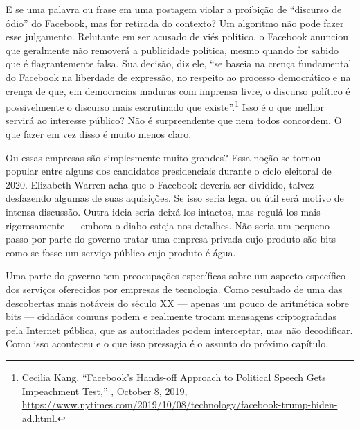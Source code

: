 E se uma palavra ou frase em uma postagem violar a proibição de ``discurso de ódio'' do Facebook,
mas for retirada do contexto? Um algoritmo não pode fazer esse julgamento. Relutante em ser acusado
de viés político, o Facebook anunciou que geralmente não removerá a publicidade política, mesmo
quando for sabido que é flagrantemente falsa. Sua decisão, diz ele, ``se baseia na crença fundamental
do Facebook na liberdade de expressão, no respeito ao processo democrático e na crença de que, em
democracias maduras com imprensa livre, o discurso político é possivelmente o discurso mais
escrutinado que existe''.\footnote{Cecilia Kang, ``Facebook’s Hands-off Approach to Political
Speech Gets Impeachment Test,'' , October 8, 2019,
\url{https://www.nytimes.com/2019/10/08/technology/facebook-trump-biden-ad.html}.} Isso é o que
melhor servirá ao interesse público? Não é surpreendente que nem todos concordem. O que fazer em
vez disso é muito menos claro.

Ou essas empresas são simplesmente muito grandes? Essa noção se tornou popular entre alguns dos
candidatos presidenciais durante o ciclo eleitoral de 2020. Elizabeth Warren acha que o Facebook
deveria ser dividido, talvez desfazendo algumas de suas aquisições. Se isso seria legal ou útil
será motivo de intensa discussão. Outra ideia seria deixá-los intactos, mas regulá-los mais
rigorosamente --- embora o diabo esteja nos detalhes. Não seria um pequeno passo por parte do
governo tratar uma empresa privada cujo produto são bits como se fosse um serviço público cujo
produto é água.

Uma parte do governo tem preocupações específicas sobre um aspecto específico dos serviços
oferecidos por empresas de tecnologia. Como resultado de uma das descobertas mais notáveis do
século XX --- apenas um pouco de aritmética sobre bits --- cidadãos comuns podem e realmente
trocam mensagens criptografadas pela Internet pública, que as autoridades podem interceptar, mas
não decodificar. Como isso aconteceu e o que isso pressagia é o assunto do próximo capítulo.